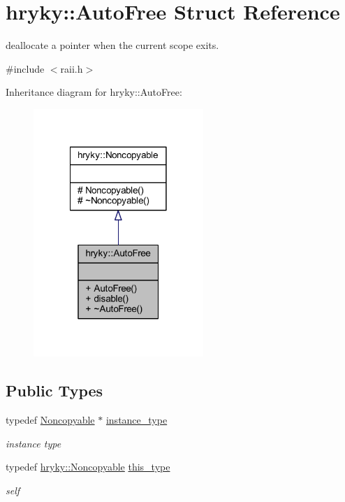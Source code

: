 \hypertarget{structhryky_1_1_auto_free}{\section{hryky\-:\-:Auto\-Free Struct Reference}
\label{structhryky_1_1_auto_free}
}


deallocate a pointer when the current scope exits.  




{\ttfamily \#include $<$raii.\-h$>$}



Inheritance diagram for hryky\-:\-:Auto\-Free\-:\nopagebreak
\begin{figure}[H]
\begin{center}
\leavevmode
\includegraphics[width=182pt]{structhryky_1_1_auto_free__inherit__graph}
\end{center}
\end{figure}
\subsection*{Public Types}
\begin{DoxyCompactItemize}
\item 
\hypertarget{classhryky_1_1_noncopyable_aaf87abb55f700af85ecb0895f6178821}{typedef \hyperlink{classhryky_1_1_noncopyable}{Noncopyable} $\ast$ \hyperlink{classhryky_1_1_noncopyable_aaf87abb55f700af85ecb0895f6178821}{instance\-\_\-type}}\label{classhryky_1_1_noncopyable_aaf87abb55f700af85ecb0895f6178821}

\begin{DoxyCompactList}\small\item\em instance type \end{DoxyCompactList}\item 
\hypertarget{classhryky_1_1_noncopyable_acf13ad1c98a76247a561dff514979da5}{typedef \hyperlink{classhryky_1_1_noncopyable}{hryky\-::\-Noncopyable} \hyperlink{classhryky_1_1_noncopyable_acf13ad1c98a76247a561dff514979da5}{this\-\_\-type}}\label{classhryky_1_1_noncopyable_acf13ad1c98a76247a561dff514979da5}

\begin{DoxyCompactList}\small\item\em self \end{DoxyCompactList}\end{DoxyCompactItemize}
